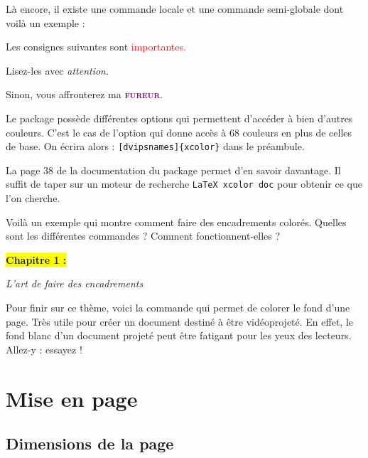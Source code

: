 Là encore, il existe une commande locale et une commande semi-globale dont voilà un exemple :\medskip

{\NewFont
\begin{SideBySideExample}
    \color{blue}
    Les consignes suivantes sont
    \textcolor{red}{importantes.}\par
    Lisez-les avec \textit{attention}.\par
    Sinon, vous affronterez ma
    \textcolor{purple}{\textbf{\textsc{fureur}}}.
\end{SideBySideExample}
}

\begin{info}
    Le package  possède différentes options qui permettent d'accéder à bien d'autres couleurs. C'est le cas de l'option  qui donne accès à 68 couleurs en plus de celles de base. On écrira alors : \texttt{[dvipsnames]\{xcolor\}} dans le préambule.\par
    La page 38 de la documentation du package permet d'en savoir davantage. Il suffit de taper sur un moteur de recherche \texttt{LaTeX xcolor doc} pour obtenir ce que l'on cherche.
\end{info}

Voilà un exemple qui montre comment faire des encadrements colorés. Quelles sont les différentes commandes ? Comment fonctionnent-elles ?\bigskip

{\NewFont
\begin{SideBySideExample}
    \begin{center}
        \colorbox{yellow}{\textbf{Chapitre 1 :}}\par
        \textit{L'art de faire des encadrements}
    \end{center}
\end{SideBySideExample}
\bigskip}

Pour finir sur ce thème, voici la commande  qui permet de colorer le fond d'une page. Très utile pour créer un document destiné à être vidéoprojeté. En effet, le fond blanc d'un document projeté peut être fatigant pour les yeux des lecteurs. Allez-y : essayez !

\section{Mise en page}

\subsection{Dimensions de la page}

